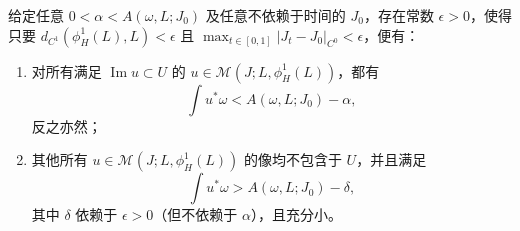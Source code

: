 \begin{proposition}
\label{prop:nearby-thick-thin-gap}
给定任意 $0<\alpha<A(\omega,L;J_0)$ 及任意不依赖于时间的 $J_0$，存在常数
$\epsilon>0$，使得只要
$d_{C^1}(\phi_H^1(L),L)<\epsilon$ 且
$\max_{t\in[0,1]}|J_t-J_0|_{C^0}<\epsilon$，便有：
\begin{enumerate}[label=(\arabic*)]
\item 对所有满足 $\operatorname{Im}u\subset U$ 的
$u\in\mathcal M(J;L,\phi_H^1(L))$，都有
\begin{equation}
 \int u^*\omega<A(\omega,L;J_0)-\alpha,
\label{eq:17-thin-area-upper}
\end{equation}
反之亦然；
\item 其他所有 $u\in\mathcal M(J;L,\phi_H^1(L))$ 的像均不包含于 $U$，并且满足
\begin{equation}
 \int u^*\omega>A(\omega,L;J_0)-\delta,
\label{eq:17-thick-area-lower}
\end{equation}
其中 $\delta$ 依赖于 $\epsilon>0$（但不依赖于 $\alpha$），且充分小。
\end{enumerate}
\end{proposition}

